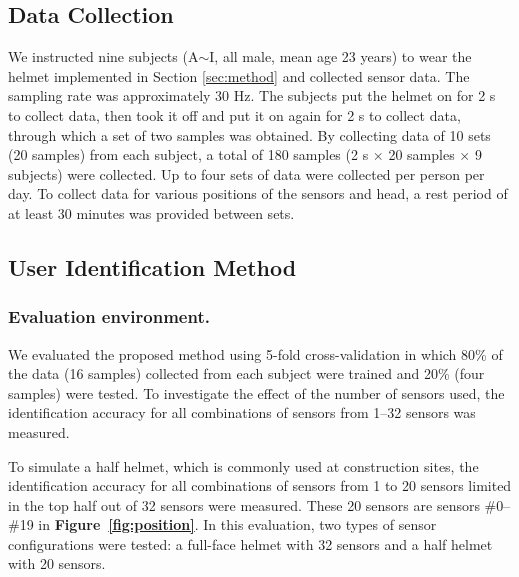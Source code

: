 \documentclass[sigconf,authordraft]{acmart}
\newcommand\figref[1]{\textbf{Figure~\ref{fig:#1}}}
\begin{document}
\subsection{Data Collection}
We instructed nine subjects (A$\sim$I, all male, mean age 23 years) to wear the helmet implemented in Section \ref{sec:method} and collected sensor data. The sampling rate was approximately 30 Hz. The subjects put the helmet on for 2 s to collect data, then took it off and put it on again for 2 s to collect data, through which a set of two samples was obtained. By collecting data of 10 sets (20 samples) from each subject, a total of 180 samples (2 s $\times$ 20 samples $\times$ 9 subjects) were collected. Up to four sets of data were collected per person per day. To collect data for various positions of the sensors and head, a rest period of at least 30 minutes was provided between sets.


\subsection{User Identification Method}
\subsubsection{Evaluation environment.}
We evaluated the proposed method using 5-fold cross-validation in which 80\% of the data (16 samples) collected from each subject were trained and 20\% (four samples) were tested. To investigate the effect of the number of sensors used, the identification accuracy for all combinations of sensors from 1–32 sensors was measured.\par

To simulate a half helmet, which is commonly used at construction sites, the identification accuracy for all combinations of sensors from 1 to 20 sensors limited in the top half out of 32 sensors were measured. These 20 sensors are sensors \#0--\#19 in \figref{position}. In this evaluation, two types of sensor configurations were tested: a full-face helmet with 32 sensors and a half helmet with 20 sensors.
\end{document}
